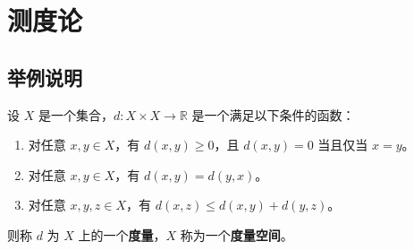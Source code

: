\documentclass[12pt, a4paper, oneside, UTF8]{ctexbook}
\begin{document}
	\else
	\fi
	
	\chapter{测度论}
	
	\section{举例说明}
	
	\begin{defn}
		设 $X$ 是一个集合，$d: X \times X \to \mathbb{R}$ 是一个满足以下条件的函数：
		\begin{enumerate}
			\item 对任意 $x, y \in X$，有 $d(x, y) \geq 0$，且 $d(x, y) = 0$ 当且仅当 $x = y$。
			\item 对任意 $x, y \in X$，有 $d(x, y) = d(y, x)$。
			\item 对任意 $x, y, z \in X$，有 $d(x, z) \leq d(x, y) + d(y, z)$。
		\end{enumerate}
		则称 $d$ 为 $X$ 上的一个\textbf{度量}，$X$ 称为一个\textbf{度量空间}。
	\end{defn}
	
	\ifx\allfiles\undefined
\end{document}
